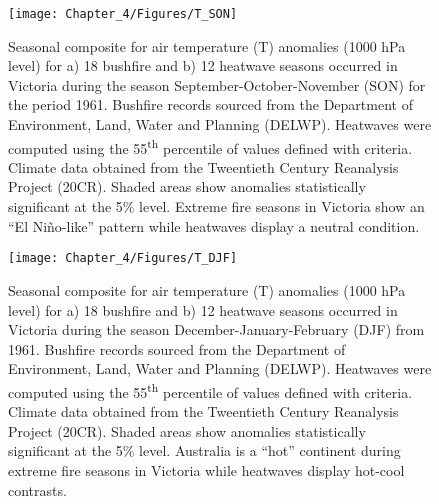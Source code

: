 \begin{figure}[h]
\noindent \begin{centering}
\texttt{[image: Chapter\_4/Figures/T\_SON]}
\par\end{centering}

\caption[Seasonal composite for air temperature (T) anomalies (1000 hPa level)
for a) 18 bushfire and b) 12 heatwave seasons occurred in Victoria during the season
September-October-November (SON) for the period 1961]{Seasonal composite for air temperature (T) anomalies (1000 hPa level)
for a) 18 bushfire and b) 12 heatwave seasons occurred in Victoria during the season
September-October-November (SON) for the period 1961.
Bushfire records sourced from the Department of Environment, Land,
Water and Planning (DELWP). Heatwaves were computed using the 55\protect\textsuperscript{th}
percentile of values defined with \citet{Nairn2009} criteria. Climate
data obtained from the Tweentieth Century Reanalysis Project (20CR).
Shaded areas show anomalies statistically significant at the 5\% level.
Extreme fire seasons in Victoria show an ``El Ni\~no-like'' pattern
while heatwaves display a neutral condition. \label{fig: Temperature anomalies (1000 hPa level) of bushfire and heatwave seasons in September-October-November for the period 1961=0020132011}}


\end{figure}


\begin{figure}[h]
\noindent \begin{centering}
\texttt{[image: Chapter\_4/Figures/T\_DJF]}
\par\end{centering}

\caption[Seasonal composite for air temperature (T) anomalies (1000 hPa level)
for a) 18 bushfire and b) 12 heatwave seasons occurred in Victoria during the season
December-January-February (DJF) from 1961]{Seasonal composite for air temperature (T) anomalies (1000 hPa level)
for a) 18 bushfire and b) 12 heatwave seasons occurred in Victoria during the season
December-January-February (DJF) from 1961. Bushfire
records sourced from the Department of Environment, Land, Water and
Planning (DELWP). Heatwaves were computed using the 55\protect\textsuperscript{th}
percentile of values defined with \citet{Nairn2009} criteria. Climate
data obtained from the Tweentieth Century Reanalysis Project (20CR).
Shaded areas show anomalies statistically significant at the 5\% level.
Australia is a ``hot'' continent during extreme fire seasons in
Victoria while heatwaves display hot-cool contrasts. \label{fig:Temperature anomalies (1000 hPa level) of bushfire and heatwave seasons in December-January-February for the period 1961=0020132011}}
\end{figure}


